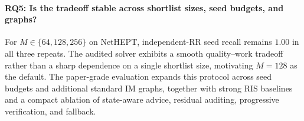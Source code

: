 \paragraph{RQ5: Is the tradeoff stable across shortlist sizes, seed budgets, and graphs?}
For $M\in\{64,128,256\}$ on NetHEPT, independent-RR seed recall remains $1.00$ in all three repeats. The audited solver exhibits a smooth quality--work tradeoff rather than a sharp dependence on a single shortlist size, motivating $M=128$ as the default. The paper-grade evaluation expands this protocol across seed budgets and additional standard IM graphs, together with strong RIS baselines and a compact ablation of state-aware advice, residual auditing, progressive verification, and fallback.
